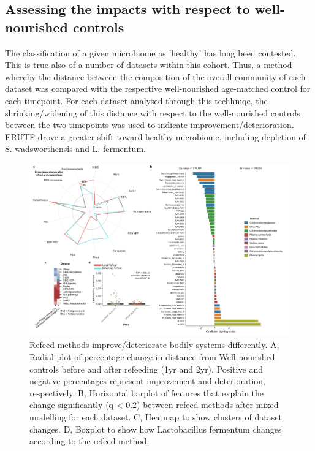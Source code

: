 \documentclass{article}
\begin{document}
\subsection*{Assessing the impacts with respect to well-nourished controls}
The classification of a given microbiome as 'healthy' has long been contested.
This is true also of a number of datasets within this cohort.
Thus, a method whereby the distance between the composition of the overall community of each dataset was compared with the respective well-nourished age-matched control for each timepoint.
For each dataset analysed through this techhniqe, the shrinking/widening of this distance with respect to the well-nourished controls between the two timepoints was used to indicate improvement/deterioration.
ERUTF drove a greater shift toward healthy microbiome, including depletion of S. wadsworthensis and L. fermentum.
\begin{figure}[H]
	\centering
	\includegraphics[scale=0.6]{../../figures/newrecoveryfeed3.pdf}
	\caption[Refeed methods improve/deteriorate bodily systems differently]{
		Refeed methods improve/deteriorate bodily systems differently.
		A, Radial plot of percentage change in distance from Well-nourished controls before and after refeeding (1yr and 2yr). Positive and negative percentages represent improvement and deterioration, respectively.
		B, Horizontal barplot of features that explain the change significantly (q < 0.2) between refeed methods after mixed modelling for each dataset.
		C, Heatmap to show clusters of dataset changes.
		D, Boxplot to show how Lactobacillus fermentum changes according to the refeed method.
	}
\label{Figure1}
\end{figure}
\end{document}
